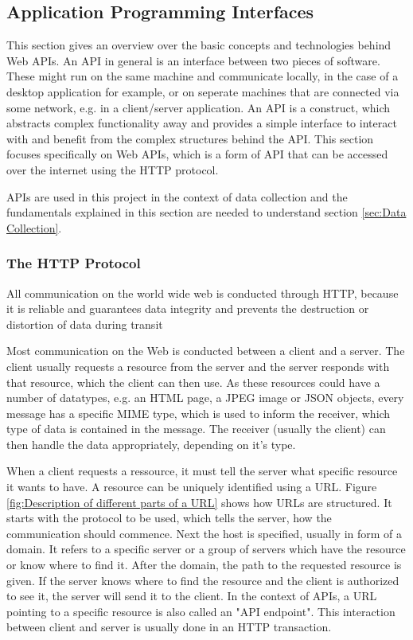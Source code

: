 \subsection{Application Programming Interfaces}

This section gives an overview over the basic concepts and technologies behind Web \acp{API}.
An \ac{API} in general is an interface between two pieces of software.\cite[S.1]{reddy2011api}
These might run on the same machine and communicate locally, in the case of a desktop application for example,
or on seperate machines that are connected via some network, e.g. in a client/server application.
An API is a construct, which abstracts complex functionality away and provides a simple interface
to interact with and benefit from the complex structures behind the API.\cite{Mozilla}
This section focuses specifically on Web APIs, which is a form of API that can be accessed over the internet
using the HTTP protocol.\cite{StoplightAPITypes}

APIs are used in this project in the context of data collection and the fundamentals explained in this section
are needed to understand section \ref{sec:Data Collection}.

\subsubsection{The HTTP Protocol}

All communication on the world wide web is conducted through \ac{HTTP},
because it is reliable and guarantees data integrity and prevents the destruction or distortion
of data during transit\cite[3f.]{gourley2002http}

Most communication on the Web is conducted between a client and a server. The client usually
requests a resource from the server and the server responds with that resource, which the client
can then use\cite[4]{gourley2002http}. As these resources could have a number of datatypes, e.g.
an HTML page, a JPEG image or JSON objects, every message has a specific MIME type,
which is used to inform the receiver, which type of data is contained in the message.
The receiver (usually the client) can then handle the data appropriately, depending on it's type.\cite[5f]{gourley2002http}

When a client requests a ressource, it must tell the server what specific resource it wants to
have. A resource can be uniquely identified using a \ac{URL}.
Figure \ref{fig:Description of different parts of a URL} shows how URLs are structured.
It starts with the protocol to be used, which tells the server, how the communication should commence.
Next the host is specified, usually in form of a domain. It refers to a specific
server or a group of servers which have the resource or know where to find it.
After the domain, the path to the requested resource is given.\cite[6f., 24]{gourley2002http}
If the server knows where to find the resource and the client is authorized to see it,
the server will send it to the client.
In the context of APIs, a URL pointing to a specific resource is also called an "API endpoint".\cite{Cooksey2014}
This interaction between client and server is usually done in an HTTP transaction.

